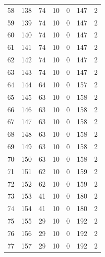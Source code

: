 \documentclass[a4paper,twoside,12pt]{book}
\begin{document}
\begin{appendices}
\begin{table}
\begin{tabular}{lrrrrrr}
		58  &    138 &        74 &        10 &               0 &             147 &         2 \\
		59  &    139 &        74 &        10 &               0 &             147 &         2 \\
		60  &    140 &        74 &        10 &               0 &             147 &         2 \\
		61  &    141 &        74 &        10 &               0 &             147 &         2 \\
		62  &    142 &        74 &        10 &               0 &             147 &         2 \\
		63  &    143 &        74 &        10 &               0 &             147 &         2 \\
		64  &    144 &        64 &        10 &               0 &             157 &         2 \\
		65  &    145 &        63 &        10 &               0 &             158 &         2 \\
		66  &    146 &        63 &        10 &               0 &             158 &         2 \\
		67  &    147 &        63 &        10 &               0 &             158 &         2 \\
		68  &    148 &        63 &        10 &               0 &             158 &         2 \\
		69  &    149 &        63 &        10 &               0 &             158 &         2 \\
		70  &    150 &        63 &        10 &               0 &             158 &         2 \\
		71  &    151 &        62 &        10 &               0 &             159 &         2 \\
		72  &    152 &        62 &        10 &               0 &             159 &         2 \\
		73  &    153 &        41 &        10 &               0 &             180 &         2 \\
		74  &    154 &        41 &        10 &               0 &             180 &         2 \\
		75  &    155 &        29 &        10 &               0 &             192 &         2 \\
		76  &    156 &        29 &        10 &               0 &             192 &         2 \\
		77  &    157 &        29 &        10 &               0 &             192 &         2 \\

\end{tabular}
\end{table}
\end{appendices}
\end{document}
